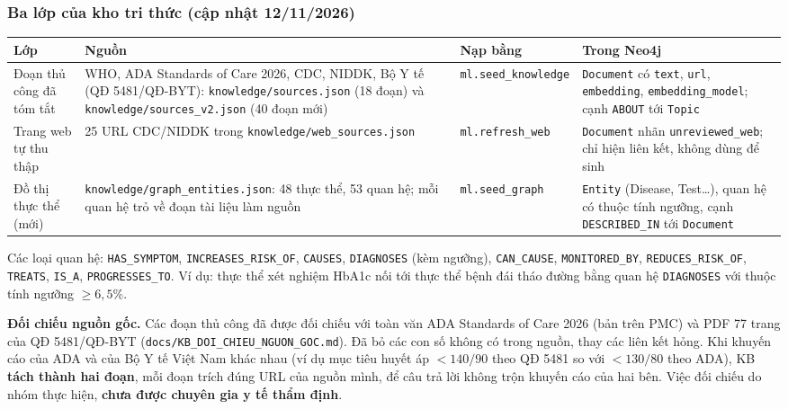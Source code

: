 \subsubsection{Ba lớp của kho tri thức (cập nhật 12/11/2026)}
\begin{longtable}{p{2.6cm}p{5.4cm}p{2.4cm}p{3.6cm}}\toprule
\textbf{Lớp} & \textbf{Nguồn} & \textbf{Nạp bằng} & \textbf{Trong Neo4j}\\\midrule\endhead
Đoạn thủ công đã tóm tắt & WHO, ADA Standards of Care 2026, CDC, NIDDK, Bộ Y tế (QĐ 5481/QĐ-BYT): \texttt{knowledge/sources.json} (18 đoạn) và \texttt{knowledge/sources\_v2.json} (40 đoạn mới) & \texttt{ml.seed\_knowledge} & \texttt{Document} có \texttt{text}, \texttt{url}, \texttt{embedding}, \texttt{embedding\_model}; cạnh \texttt{ABOUT} tới \texttt{Topic}\\
Trang web tự thu thập & 25 URL CDC/NIDDK trong \texttt{knowledge/web\_sources.json} & \texttt{ml.refresh\_web} & \texttt{Document} nhãn \texttt{unreviewed\_web}; chỉ hiện liên kết, không dùng để sinh\\
Đồ thị thực thể (mới) & \texttt{knowledge/graph\_entities.json}: 48 thực thể, 53 quan hệ; mỗi quan hệ trỏ về đoạn tài liệu làm nguồn & \texttt{ml.seed\_graph} & \texttt{Entity} (Disease, Test\dots), quan hệ có thuộc tính ngưỡng, cạnh \texttt{DESCRIBED\_IN} tới \texttt{Document}\\\bottomrule
\end{longtable}
Các loại quan hệ: \texttt{HAS\_SYMPTOM}, \texttt{INCREASES\_RISK\_OF}, \texttt{CAUSES}, \texttt{DIAGNOSES} (kèm ngưỡng), \texttt{CAN\_CAUSE}, \texttt{MONITORED\_BY}, \texttt{REDUCES\_RISK\_OF}, \texttt{TREATS}, \texttt{IS\_A}, \texttt{PROGRESSES\_TO}. Ví dụ: thực thể xét nghiệm HbA1c nối tới thực thể bệnh đái tháo đường bằng quan hệ \texttt{DIAGNOSES} với thuộc tính ngưỡng $\geq 6{,}5\%$.

\textbf{Đối chiếu nguồn gốc.} Các đoạn thủ công đã được đối chiếu với toàn văn ADA Standards of Care 2026 (bản trên PMC) và PDF 77 trang của QĐ 5481/QĐ-BYT (\texttt{docs/KB\_DOI\_CHIEU\_NGUON\_GOC.md}). Đã bỏ các con số không có trong nguồn, thay các liên kết hỏng. Khi khuyến cáo của ADA và của Bộ Y tế Việt Nam khác nhau (ví dụ mục tiêu huyết áp $<140/90$ theo QĐ 5481 so với $<130/80$ theo ADA), KB \textbf{tách thành hai đoạn}, mỗi đoạn trích đúng URL của nguồn mình, để câu trả lời không trộn khuyến cáo của hai bên. Việc đối chiếu do nhóm thực hiện, \textbf{chưa được chuyên gia y tế thẩm định}.

